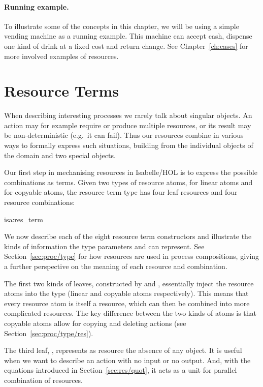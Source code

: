 \documentclass[class=smolathesis,crop=false]{standalone}
\begin{document}
\paragraph*{Running example.}
To illustrate some of the concepts in this chapter, we will be using a simple vending machine as a running example.
This machine can accept cash, dispense one kind of drink at a fixed cost and return change.
See Chapter~\ref{ch:cases} for more involved examples of resources.

\section{Resource Terms}
\label{sec:res/terms}

When describing interesting processes we rarely talk about singular objects.
An action may for example require or produce multiple resources, or its result may be non-deterministic (e.g.\ it can fail).
Thus our resources combine in various ways to formally express such situations, building from the individual objects of the domain and two special objects.

Our first step in mechanising resources in Isabelle/HOL is to express the possible combinations as terms.
Given two types of resource atoms,  for linear atoms and  for copyable atoms, the resource term type  has four leaf resources and four resource combinations:
\begin{isadef}{isa:res_term}
  
\end{isadef}

We now describe each of the eight resource term constructors and illustrate the kinds of information the type parameters  and  can represent.
See Section~\ref{sec:proc/type} for how resources are used in process compositions, giving a further perspective on the meaning of each resource and combination.

The first two kinds of leaves, constructed by  and , essentially inject the resource atoms into the type (linear and copyable atoms respectively).
This means that every resource atom is itself a resource, which can then be combined into more complicated resources.
The key difference between the two kinds of atoms is that copyable atoms allow for copying and deleting actions (see Section~\ref{sec:proc/type/res}).

The third leaf, , represents as resource the absence of any object.
It is useful when we want to describe an action with no input or no output.
And, with the equations introduced in Section~\ref{sec:res/quot}, it acts as a unit for parallel combination of resources.
\end{document}
